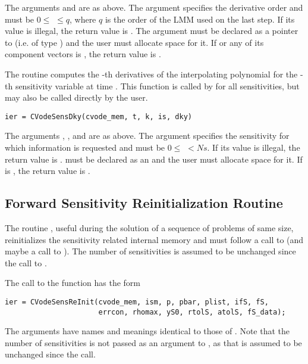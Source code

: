 The arguments  and  are as above.
The argument  specifies the derivative order and must be 
$0 \le$  $\le q$, where $q$ is the order of the LMM used on the last step.
If its value is illegal, the return value is .
The argument  must be declared as a pointer to  (i.e. of type
) and the user must allocate space for it. 
If  or any of its component vectors is , the return value is .

The routine  computes the -th derivatives of the interpolating 
polynomial for the -th sensitivity variable at time .
This function is called by  for all sensitivities, but may 
also be called directly by the user.
\begin{verbatim}
ier = CVodeSensDky(cvode_mem, t, k, is, dky)
\end{verbatim}

The arguments , , and  are as above.
The argument  specifies the sensitivity for which information
is requested and must be $0 \le$  $< Ns$. If its value is illegal, the return
value is .
 must be declared as an  and the user
must allocate space for it. If  is , the return value 
is .

\subsection{Forward Sensitivity Reinitialization Routine}\label{sss:cvsreinit}

The routine , useful during the solution of a sequence of problems of 
same size, reinitializes the sensitivity related internal memory 
and must follow a call to  (and maybe a call to ). 
The number  of sensitivities is assumed to be unchanged since the call to 
.

The call to the  function has the form
\begin{verbatim}
ier = CVodeSensReInit(cvode_mem, ism, p, pbar, plist, ifS, fS,
                      errcon, rhomax, yS0, rtolS, atolS, fS_data);
\end{verbatim}
The arguments have names and meanings identical to those of .
Note that the number of sensitivities  is not passed as an argument to 
, as that is assumed to be unchanged since 
the  call. 

